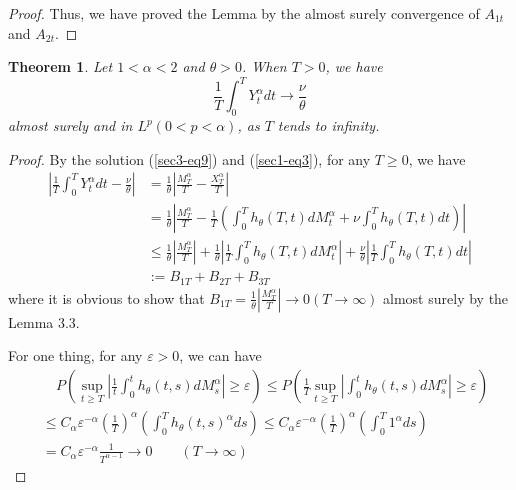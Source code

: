 \documentclass[11pt]{amsart}
\theoremstyle{plain}
\newtheorem{theorem}{Theorem}[section]
\numberwithin{equation}{section}
\begin{document}
\begin{proof}
Thus, we have proved the Lemma by the almost surely convergence of $A_{1t}$ and $A_{2t}$.
\end{proof}

\begin{theorem}
Let $1<\alpha<2$ and $\theta>0$. When $T>0$, we have
\begin{equation}\label{sec3-eq17}
\frac{1}{T}\int_0^T Y_t^\alpha dt\longrightarrow\frac{\nu}{\theta}
\end{equation} 
almost surely and in $L^p(0<p<\alpha)$, as $T$ tends to infinity.
\end{theorem}

\begin{proof}
By the solution (\ref{sec3-eq9}) and (\ref{sec1-eq3}), for any $T \geq 0 $, we have 
\begin{equation*}
\begin{aligned}
\left|\frac{1}{T}\int_0^T Y_t^\alpha dt-\frac{\nu}{\theta}\right|&=\frac{1}{\theta }\left|\frac{M_T^\alpha}{T}-\frac{X_T^\alpha}{T}\right|\\
&=\frac{1}{\theta}\left|\frac{M_T^\alpha}{T}-\frac{1}{T}\left(\int_0^T h_\theta(T,t)dM_t^\alpha+\nu\int_0^T h_\theta(T,t)dt\right)\right|\\
&\leq \frac{1}{\theta }\left|\frac{M_T^\alpha}{T}\right|+\frac{1}{\theta}\left|\frac{1}{T}\int_0^T h_\theta(T,t)dM_t^\alpha\right|+\frac{\nu}{\theta}\left|\frac{1}{T}\int_0^T h_\theta(T,t)dt\right|\\
&:=B_{1T}+B_{2T}+B_{3T}
\end{aligned}
\end{equation*}
where it is obvious to show that $B_{1T}=\frac{1}{\theta }\left|\frac{M_T^\alpha}{T}\right|\longrightarrow0(T\rightarrow\infty)$ almost surely by the Lemma 3.3.

For one thing, for any $\varepsilon>0$, we can have
\begin{equation*}
\begin{aligned}
&\quad P\left(\sup_{t\geq T}\left|\frac{1}{t}\int_0^t h_\theta(t,s)dM_s^\alpha\right|\geq \varepsilon\right)\leq P\left(\frac{1}{T}\sup_{t\geq T}\left|\int_0^t h_\theta(t,s)dM_s^\alpha\right|\geq \varepsilon\right)\\
&\leq C_\alpha\varepsilon^{-\alpha}\left(\frac{1}{T}\right)^\alpha\left(\int_0^T h_\theta(t,s)^\alpha ds\right)\leq C_\alpha\varepsilon^{-\alpha}\left(\frac{1}{T}\right)^\alpha\left(\int_0^T 1^\alpha ds\right)\\
&=C_\alpha\varepsilon^{-\alpha}\frac{1}{T^{\alpha-1}}\longrightarrow 0 \qquad (T\rightarrow\infty)
\end{aligned}
\end{equation*}


\end{proof}
\end{document}
